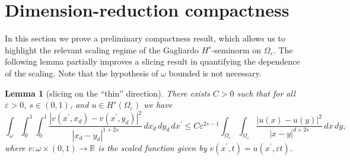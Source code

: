 \documentclass[11pt]{article}
\newtheorem{lemma}[definition]{Lemma}
\def\e{\varepsilon}
\begin{document}
\section{Dimension-reduction compactness}
In this section we prove a preliminary compactness result, which allows us to highlight the relevant scaling regime of the Gagliardo $H^s$-seminorm on $\Omega_\e$. The following lemma partially improves a slicing result in \cite[Lemma 6.36]{leofrac} quantifying the dependence of the scaling. Note that the hypothesis of $\omega$ bounded is not necessary.

\begin{lemma}[slicing on the ``thin'' direction]\label{slixd} There exists $C>0$ such that for all $\e>0$, $s\in(0,1)$, and $u\in H^s(\Omega_\e)$ we have
\begin{equation}\label{slixd-eq}
\int_\omega\int_0^1\int_0^1 \frac{|v(x^\prime,x_d)-v(x^\prime,y_d)|^2}{|x_d-y_d|^{1+2s}}\, dx_d\, dy_d\, dx^\prime\leq C\e^{2s-1}\int_{\Omega_\e}\int_{\Omega_\e} \frac{|u(x)-u(y)|^2}{|x-y|^{d+2s}}\, dx\, dy, 
\end{equation}
where $v\colon\omega\times (0,1)\to \mathbb R$ is the scaled function given by 
$v(x^\prime, t)=u(x^\prime,\e t)$. 
\end{lemma}
\end{document}
